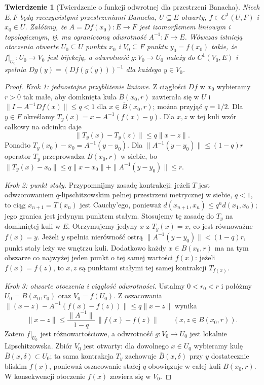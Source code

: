 \documentclass[11pt,a4paper]{article}
\numberwithin{equation}{section}
\theoremstyle{plain}
\newtheorem{twierdzenie}{Twierdzenie}[section]
\theoremstyle{definition}
\theoremstyle{remark}
\begin{document}
\begin{twierdzenie}[Twierdzenie o funkcji odwrotnej dla przestrzeni Banacha]
\label{thm:inverse15}
Niech $E,F$ będą rzeczywistymi przestrzeniami Banacha, $U\subseteq E$ otwarty, $f\in C^1(U,F)$ i $x_0\in U$. Załóżmy, że $A=Df(x_0):E\to F$ jest izomorfizmem liniowym i topologicznym, tj. ma ograniczoną odwrotność $A^{-1}:F\to E$. Wówczas istnieją otoczenia otwarte $U_0\subseteq U$ punktu $x_0$ i $V_0\subseteq F$ punktu $y_0=f(x_0)$ takie, że $f|_{U_0}:U_0\to V_0$ jest bijekcją, a odwrotność $g:V_0\to U_0$ należy do $C^1(V_0,E)$ i spełnia
$Dg(y)=(Df(g(y)))^{-1}$ dla każdego $y\in V_0$.
\end{twierdzenie}
\begin{proof}
\emph{Krok 1: jednostajne przybliżenie liniowe.} Z ciągłości $Df$ w $x_0$ wybieramy $r>0$ tak małe, aby domknięta kula $\overline B(x_0,r)$ zawierała się w $U$ i
$\|I-A^{-1}Df(x)\|\le q<1$ dla $x\in\overline B(x_0,r)$; można przyjąć $q=1/2$. Dla $y\in F$ określamy $T_y(x)=x-A^{-1}(f(x)-y)$. Dla $x,z$ w tej kuli wzór całkowy na odcinku daje
\[
\|T_y(x)-T_y(z)\|\le q\|x-z\|.
\]
Ponadto $T_y(x_0)-x_0=A^{-1}(y-y_0)$. Dla $\|A^{-1}(y-y_0)\|\le(1-q)r$ operator $T_y$ przeprowadza $\overline B(x_0,r)$ w siebie, bo
$\|T_y(x)-x_0\|\le q\|x-x_0\|+\|A^{-1}(y-y_0)\|\le r$.

\emph{Krok 2: punkt stały.} Przypomnijmy zasadę kontrakcji: jeżeli $T$ jest odwzorowaniem $q$-lipschitzowskim pełnej przestrzeni metrycznej w siebie, $q<1$, to ciąg $x_{n+1}=T(x_n)$ jest Cauchy'ego, ponieważ $d(x_{n+1},x_n)\le q^n d(x_1,x_0)$; jego granica jest jedynym punktem stałym. Stosujemy tę zasadę do $T_y$ na domkniętej kuli w $E$. Otrzymujemy jedyny $x$ z $T_y(x)=x$, co jest równoważne $f(x)=y$. Jeżeli $y$ spełnia nierówność ostrą $\|A^{-1}(y-y_0)\|<(1-q)r$, punkt stały leży we wnętrzu kuli. Dodatkowo każdy $x\in B(x_0,r)$ ma na tym obszarze co najwyżej jeden punkt o tej samej wartości $f(x)$: jeżeli $f(x)=f(z)$, to $x,z$ są punktami stałymi tej samej kontrakcji $T_{f(x)}$.

\emph{Krok 3: otwarte otoczenia i ciągłość odwrotności.} Ustalmy $0<r_0<r$ i połóżmy $U_0=B(x_0,r_0)$ oraz $V_0=f(U_0)$. Z oszacowania
$\|(x-z)-A^{-1}(f(x)-f(z))\|\le q\|x-z\|$ wynika
\[
\|x-z\|\le\frac{\|A^{-1}\|}{1-q}\,\|f(x)-f(z)\| \qquad(x,z\in B(x_0,r)).
\]
Zatem $f|_{U_0}$ jest różnowartościowe, a odwrotność $g:V_0\to U_0$ jest lokalnie Lipschitzowska. Zbiór $V_0$ jest otwarty: dla dowolnego $x\in U_0$ wybieramy kulę $\overline B(x,\delta)\subset U_0$; ta sama kontrakcja $T_y$ zachowuje $\overline B(x,\delta)$ przy $y$ dostatecznie bliskim $f(x)$, ponieważ oszacowanie stałej $q$ obowiązuje w całej kuli $B(x_0,r)$. W konsekwencji otoczenie $f(x)$ zawiera się w $V_0$.


\end{proof}
\end{document}
